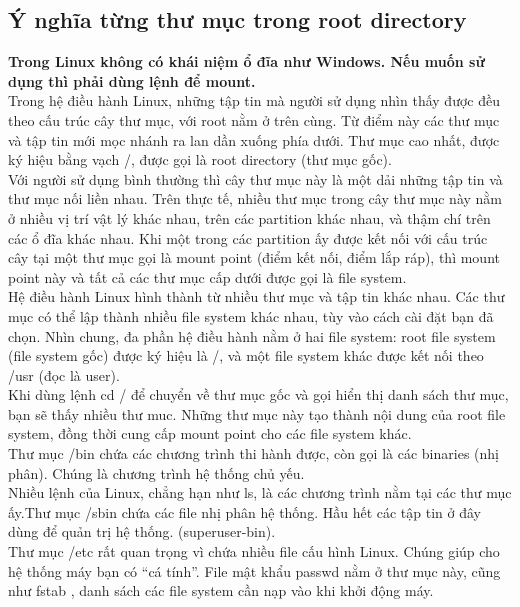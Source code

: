 \documentclass[twoside]{article}
\begin{document}
\subsection{Ý nghĩa từng thư mục trong root directory}
\textbf{Trong Linux không có khái niệm ổ đĩa như Windows. Nếu muốn sử dụng thì phải dùng lệnh để mount.}\\
Trong hệ điều hành Linux, những tập tin mà người sử dụng nhìn thấy được đều theo cấu trúc cây thư mục, với root nằm ở trên cùng. Từ điểm này các thư mục và tập tin mới mọc nhánh ra lan dần xuống phía dưới. Thư mục cao nhất, được ký hiệu bằng vạch /, được gọi là root directory (thư mục gốc). \\
Với người sử dụng bình thường thì cây thư mục này là một dải những tập tin và thư mục nối liền nhau. Trên thực tế, nhiều thư mục trong cây thư mục này nằm ở nhiều vị trí vật lý khác nhau, trên các partition khác nhau, và thậm chí trên các ổ đĩa khác nhau. Khi một trong các partition ấy được kết nối với cấu trúc cây tại một thư mục gọi là mount point (điểm kết nối, điểm lắp ráp), thì mount point này và tất cả các thư mục cấp dưới được gọi là file system. \\
Hệ điều hành Linux hình thành từ nhiều thư mục và tập tin khác nhau. Các thư mục có thể lập thành nhiều file system khác nhau, tùy vào cách cài đặt bạn đã chọn. Nhìn chung, đa phần hệ điều hành nằm ở hai file system: root file system (file system gốc) được ký hiệu là /, và một file system khác được kết nối theo /usr (đọc là user).\\

Khi dùng lệnh cd / để chuyển về thư mục gốc và gọi hiển thị danh sách thư mục, bạn sẽ thấy nhiều thư muc. Những thư mục này tạo thành nội dung của root file system, đồng thời cung cấp mount point cho các file system khác. \\

Thư mục /bin chứa các chương trình thi hành được, còn gọi là các binaries (nhị phân). Chúng là chương trình hệ thống chủ yếu. \\

Nhiều lệnh của Linux, chẳng hạn như ls, là các chương trình nằm tại các thư mục ấy.Thư mục /sbin chứa các file nhị phân hệ thống. Hầu hết các tập tin ở đây dùng để quản trị hệ thống. (superuser-bin). \\

Thư mục /etc rất quan trọng vì chứa nhiều file cấu hình Linux. Chúng giúp cho hệ thống máy bạn có “cá tính”. File mật khẩu passwd nằm ở thư mục này, cũng như fstab , danh sách các file system cần nạp vào khi khởi động máy. \\
\end{document}
